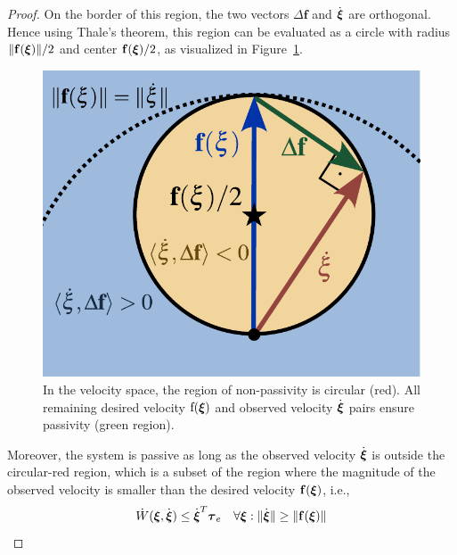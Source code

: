 \begin{proof}
On the border of this region, the two vectors $\Delta \mathbf{f}$ and $\dot{\mathbf {\boldsymbol{\xi}}}$ are orthogonal.
Hence using Thale's theorem, this region can be evaluated as a circle with radius $\| \mathbf{f} ({\boldsymbol{\xi}}) \| / 2$ and center $\mathbf{f}(\mathbf {\boldsymbol{\xi}}) / 2$, as visualized in Figure~\ref{fig:passivity_analysis}.

\begin{figure}[b]
	\centering
    \includegraphics[width=0.7\columnwidth]{figures/passivity_analysis}
	\caption{In the velocity space, the region of non-passivity is circular (red). All remaining desired velocity $\mathrm f(\mathrm{{\boldsymbol{\xi}}})$ and observed velocity $\dot{\mathrm {\boldsymbol{\xi}}}$ pairs ensure passivity (green region).}
	\label{fig:passivity_analysis}
\end{figure}

Moreover, the system is passive as long as the observed velocity $\dot{{\boldsymbol{\xi}}}$ is outside the circular-red region, which is a subset of the region where the magnitude of the observed velocity is smaller than the desired velocity $\mathbf{f}({\boldsymbol{\xi}})$, i.e.,
\begin{equation}
	\dot W({\boldsymbol{\xi}}, \dot{{\boldsymbol{\xi}}}) \leq \dot{{\boldsymbol{\xi}}}^T \boldsymbol{\tau}_e
 \quad \forall {\boldsymbol{\xi}} : \| \dot{{\boldsymbol{\xi}}} \| \geq\| \mathbf{f}({\boldsymbol{\xi}}) \| 
\end{equation}


\end{proof}
